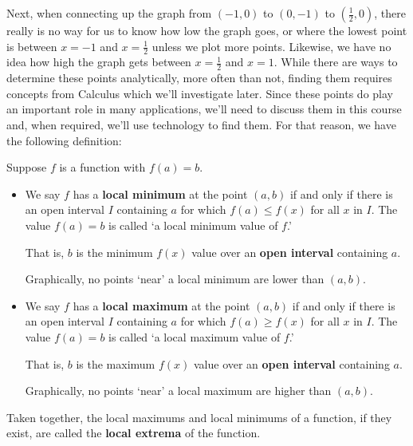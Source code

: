 \documentclass{ximera}
\begin{document}

Next, when connecting up the graph from $(-1,0)$ to $(0,-1)$ to $\left(\frac{1}{2}, 0 \right)$, there really is no way for us to know how low the graph goes, or where the lowest point is between $x = -1$ and $x = \frac{1}{2}$  unless we plot more points.  Likewise, we have no idea how high the graph gets between $x = \frac{1}{2}$ and $x = 1$.  While there are ways to determine these points analytically, more often than not, finding them requires concepts from Calculus which we'll investigate later.   Since these points do play an important role in many applications, we'll need to discuss them in this course and, when required, we'll  use technology to find them.   For that reason, we have the following definition:




\begin{definition}

\label{localmaxmindefn}

Suppose $f$ is a function with $f(a) = b$.

\begin{itemize}

\item  We say $f$ has a \textbf{local minimum} at the point $(a,b)$ if and only if there is an open interval $I$ containing $a$ for which $f(a) \leq f(x)$ for all $x$ in $I$.  The value $f(a) = b$ is called `a  local minimum value of $f$.' 

That is, $b$ is the minimum $f(x)$ value over an \textbf{open interval}  containing $a$. 

 Graphically,  no points `near' a local minimum are lower than $(a,b)$. 

\item  We say $f$ has a \textbf{local maximum} at the point $(a,b)$ if and only if there is an open interval $I$ containing $a$ for which $f(a) \geq f(x)$ for all $x$ in $I$.  The value $f(a) = b$ is called `a  local maximum value of $f$.' 

That is, $b$ is the maximum $f(x)$ value over an \textbf{open interval} containing $a$.  

Graphically, no points `near' a local maximum are higher than $(a,b)$. 

\end{itemize}

Taken together, the local maximums and local minimums of a function, if they exist,  are called the \textbf{local extrema} of the function. 



\end{definition}
\end{document}
